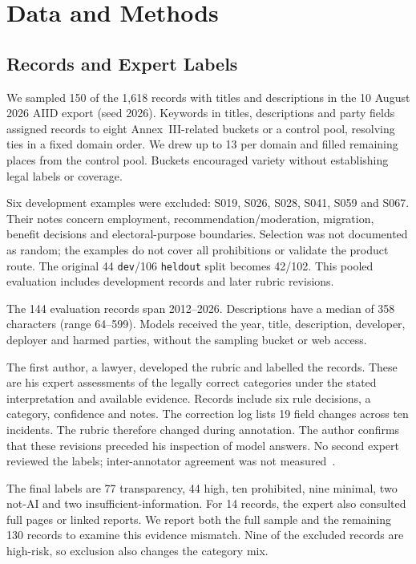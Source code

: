 \documentclass[sigconf,natbib=false,language=english]{acmart}
\begin{document}
\section{Data and Methods}
\subsection{Records and Expert Labels}
We sampled 150 of the 1,618 records with titles and descriptions in the 10 August 2026 AIID export (seed 2026). Keywords in titles, descriptions and party fields assigned records to eight Annex~III-related buckets or a control pool, resolving ties in a fixed domain order. We drew up to 13 per domain and filled remaining places from the control pool. Buckets encouraged variety without establishing legal labels or coverage.

Six development examples were excluded: S019, S026, S028, S041, S059 and S067. Their notes concern employment, recommendation/moderation, migration, benefit decisions and electoral-purpose boundaries. Selection was not documented as random; the examples do not cover all prohibitions or validate the product route. The original 44 \texttt{dev}/106 \texttt{heldout} split becomes 42/102. This pooled evaluation includes development records and later rubric revisions.

The 144 evaluation records span 2012--2026. Descriptions have a median of 358 characters (range 64--599). Models received the year, title, description, developer, deployer and harmed parties, without the sampling bucket or web access.

The first author, a lawyer, developed the rubric and labelled the records. These are his expert assessments of the legally correct categories under the stated interpretation and available evidence. Records include six rule decisions, a category, confidence and notes. The correction log lists 19 field changes across ten incidents. The rubric therefore changed during annotation. The author confirms that these revisions preceded his inspection of model answers. No second expert reviewed the labels; inter-annotator agreement was not measured~\cite{artstein2008}.

The final labels are 77 transparency, 44 high, ten prohibited, nine minimal, two not-AI and two insufficient-information. For 14 records, the expert also consulted full pages or linked reports. We report both the full sample and the remaining 130 records to examine this evidence mismatch. Nine of the excluded records are high-risk, so exclusion also changes the category mix.
\end{document}
